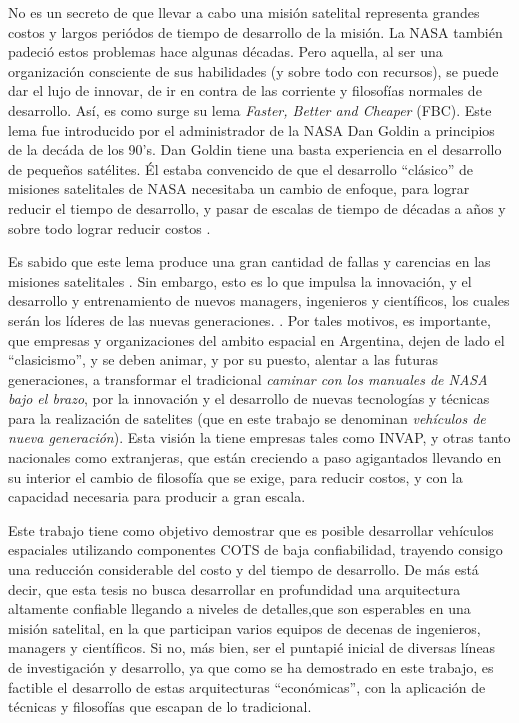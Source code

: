 No es un secreto de que llevar a cabo una misión satelital representa grandes costos
y largos periódos de tiempo de desarrollo de la misión.
La NASA también padeció estos problemas hace algunas décadas.
Pero aquella, al ser una organización consciente de sus habilidades (y sobre todo con recursos),
se puede dar el lujo de innovar, de ir en contra de las corriente y filosofías normales de desarrollo.
Así, es como surge su lema \textit{Faster, Better and Cheaper} (FBC).
Este lema fue introducido por el administrador de la NASA Dan Goldin a
principios de la decáda de los 90's. Dan Goldin tiene una basta experiencia en
el desarrollo de pequeños satélites. Él estaba convencido de que el desarrollo
``clásico'' de misiones satelitales de NASA necesitaba un cambio de enfoque,
para lograr reducir el tiempo de desarrollo, y pasar de escalas de tiempo de
décadas a años y sobre todo lograr reducir costos \citep{Paxton07}.

Es sabido que este lema produce una gran cantidad de fallas y
carencias en las misiones satelitales \citep{Paxton07}. Sin embargo,
esto es lo que impulsa la innovación, y el desarrollo y entrenamiento de nuevos
managers, ingenieros y científicos, los cuales serán los líderes de las
nuevas generaciones. \citep{Paxton07}. Por tales motivos, es importante,
que empresas y organizaciones del ambito espacial en Argentina, dejen
de lado el ``clasicismo'', y se deben animar, y por su puesto, alentar a las futuras
generaciones, a transformar el tradicional \textit{caminar con los manuales de NASA bajo
  el brazo},  por la innovación y el desarrollo de nuevas tecnologías y técnicas
para la realización de satelites (que en este trabajo se denominan
\textit{vehículos de nueva generación}). Esta visión la tiene empresas tales como INVAP,
y otras tanto nacionales como extranjeras,  que están creciendo a paso agigantados llevando
en su interior el cambio de filosofía que se exige, para reducir costos, y con la capacidad
necesaria para producir a gran escala.

Este trabajo tiene como objetivo demostrar que es posible desarrollar
vehículos espaciales utilizando componentes COTS de baja confiabilidad, trayendo
consigo una reducción considerable del costo y del tiempo de desarrollo. De más está
decir, que esta tesis no busca desarrollar en profundidad una arquitectura
altamente confiable llegando a niveles de detalles,que son esperables en una misión satelital, en la
que participan varios equipos de decenas de ingenieros, managers y científicos. Si no,
más bien, ser el puntapié inicial de diversas líneas de investigación y desarrollo,
ya que como se ha demostrado en este trabajo, es factible el desarrollo de estas arquitecturas
``económicas'', con la aplicación de técnicas y filosofías que escapan de lo tradicional.

